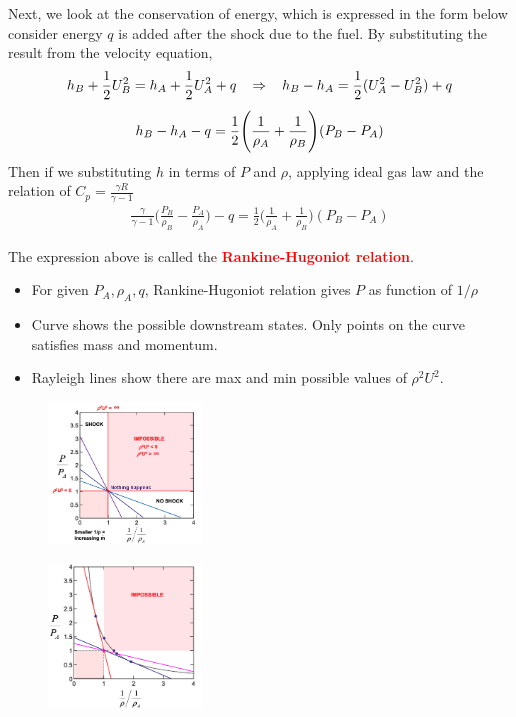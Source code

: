 \documentclass[a4paper,10pt]{article}
\begin{document}
\vspace*{-0.4cm}
Next, we look at the conservation of energy, which is expressed in the form below consider energy $q$ is added after the shock due to the fuel. By substituting the result from the velocity equation, 
\begin{gather*}
    h_B+\frac{1}{2}U_B^2=h_A+\frac{1}{2}U_A^2+q\hspace*{0.3cm}\Rightarrow\hspace*{0.3cm}h_B-h_A = \frac{1}{2}(U_A^2-U_B^2)+q\\[0.15cm]
    h_B-h_A-q=\frac{1}{2}\Bigg(\frac{1}{\rho_A}+\frac{1}{\rho_B}\Bigg)(P_B-P_A)
\end{gather*}
Then if we substituting $h$ in terms of $P$ and $\rho$, applying ideal gas law and the relation of $C_p = \frac{\gamma R}{\gamma-1}$
\begin{gather*}
    \boxed{\frac{\gamma}{\gamma-1}\Bigg(\frac{P_B}{\rho_B}-\frac{P_A}{\rho_A}\Bigg)-q=\frac{1}{2}\Bigg(\frac{1}{\rho_A}+\frac{1}{\rho_B}\Bigg)(P_B-P_A)}
\end{gather*}

The expression above is called the \textcolor{red}{\textbf{Rankine-Hugoniot relation}}.
\begin{itemize}
    \item For given $P_A,\rho_A,q$, Rankine-Hugoniot relation gives $P$ as function of $1/\rho$
    \item Curve shows the possible downstream states. Only points on the curve satisfies mass and momentum.
    \item Rayleigh lines show there are max and min possible values of $\rho^2U^2$. 
\end{itemize}

\begin{multicols}{2}
    \begin{figure}[H]
        \centering
        \includegraphics[width=0.36\textwidth]{Figure/rayleigh.png}
    \end{figure}
    \begin{figure}[H]
        \centering
        \includegraphics[width=0.36\textwidth]{Figure/RH.png}
    \end{figure}
\end{multicols}
\end{document}
